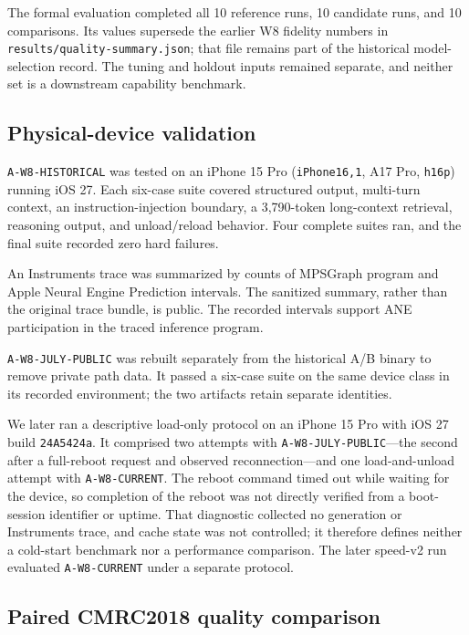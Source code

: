 \documentclass[10pt]{article}
\DeclareRobustCommand{\evidence}[1]{}
\DeclareRobustCommand{\artifact}[1]{\nolinkurl{#1}}
\begin{document}
The formal evaluation completed all 10 reference runs, 10 candidate runs, and 10 comparisons. Its values supersede the earlier W8 fidelity numbers in \artifact{results/quality-summary.json}; that file remains part of the historical model-selection record. The tuning and holdout inputs remained separate, and neither set is a downstream capability benchmark.\evidence{CL-06,CL-07}

\subsection{Physical-device validation}

\artifact{A-W8-HISTORICAL} was tested on an iPhone 15 Pro (\artifact{iPhone16,1}, A17 Pro, \artifact{h16p}) running iOS 27. Each six-case suite covered structured output, multi-turn context, an instruction-injection boundary, a 3,790-token long-context retrieval, reasoning output, and unload/reload behavior. Four complete suites ran, and the final suite recorded zero hard failures.\evidence{CL-08}

An Instruments trace was summarized by counts of MPSGraph program and Apple Neural Engine Prediction intervals. The sanitized summary, rather than the original trace bundle, is public. The recorded intervals support ANE participation in the traced inference program.\evidence{CL-09}

\artifact{A-W8-JULY-PUBLIC} was rebuilt separately from the historical A/B binary to remove private path data. It passed a six-case suite on the same device class in its recorded environment; the two artifacts retain separate identities.\evidence{CL-10,CL-22}

We later ran a descriptive load-only protocol on an iPhone 15 Pro with iOS 27 build \artifact{24A5424a}. It comprised two attempts with \artifact{A-W8-JULY-PUBLIC}---the second after a full-reboot request and observed reconnection---and one load-and-unload attempt with \artifact{A-W8-CURRENT}. The reboot command timed out while waiting for the device, so completion of the reboot was not directly verified from a boot-session identifier or uptime. That diagnostic collected no generation or Instruments trace, and cache state was not controlled; it therefore defines neither a cold-start benchmark nor a performance comparison. The later speed-v2 run evaluated \artifact{A-W8-CURRENT} under a separate protocol.\evidence{CL-28}

\subsection{Paired CMRC2018 quality comparison}
\end{document}
